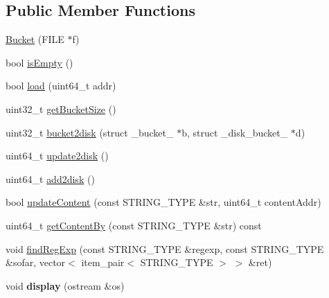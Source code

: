 \subsection*{Public Member Functions}
\begin{CompactItemize}
\item 
\hyperlink{classBucket_a0bd7f7ab82c22a5e7d04e0b60041276}{Bucket} (FILE $\ast$f)
\item 
bool \hyperlink{classBucket_ed3a301fdef6969da839b34bda7b6abe}{isEmpty} ()
\item 
bool \hyperlink{classBucket_c1379230ff19af55316bd31080205e95}{load} (uint64\_\-t addr)
\item 
uint32\_\-t \hyperlink{classBucket_aa355c777d45203d1a6db708c7998177}{getBucketSize} ()
\item 
uint32\_\-t \hyperlink{classBucket_bf1cc5a3b92c5c12c15567267eee7d6a}{bucket2disk} (struct \_\-bucket\_\- $\ast$b, struct \_\-disk\_\-bucket\_\- $\ast$d)
\item 
uint64\_\-t \hyperlink{classBucket_64a8ed1acf8ff0e212564a6711a125ff}{update2disk} ()
\item 
uint64\_\-t \hyperlink{classBucket_33dd269a8695c6b43c7b6f529fb00ba1}{add2disk} ()
\item 
bool \hyperlink{classBucket_9aef14ec50558bf257172ed9ace35347}{updateContent} (const STRING\_\-TYPE \&str, uint64\_\-t contentAddr)
\item 
uint64\_\-t \hyperlink{classBucket_1ef6129b70649d002cdfc91cb450c890}{getContentBy} (const STRING\_\-TYPE \&str) const 
\item 
void \hyperlink{classBucket_5765eb43f348b3868173dd4360e031bc}{findRegExp} (const STRING\_\-TYPE \&regexp, const STRING\_\-TYPE \&sofar, vector$<$ item\_\-pair$<$ STRING\_\-TYPE $>$ $>$ \&ret)
\item 
\hypertarget{classBucket_2b87564ba0e8e99e7c586010bccbe8a7}{
void \textbf{display} (ostream \&os)}
\label{classBucket_2b87564ba0e8e99e7c586010bccbe8a7}


\end{CompactItemize}
